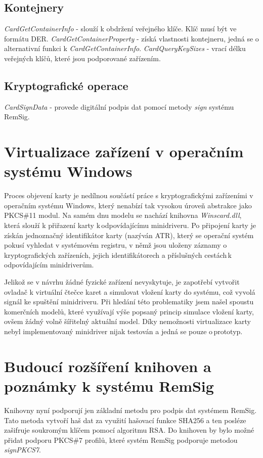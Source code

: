 \documentclass[]{fithesis3}
\begin{document}
		\subsection{Kontejnery}
		\textit{CardGetContainerInfo} - slouží k obdržení veřejného klíče. Klíč musí být 			ve formátu DER.
		\newline
 		\newline
		\textit{CardGetContainerProperty} - získá vlastnosti kontejneru, jedná se o alternativní 			funkci k \textit{CardGetContainerInfo}.
		\newline
		\newline
		\textit{CardQueryKeySizes} - vrací délku veřejných klíčů, které jsou podporované 				zařízením.

		\subsection{Kryptografické operace}
		\textit{CardSignData} - provede digitální podpis dat pomocí metody  \textit{sign} systému 			RemSig. 

	\section{Virtualizace zařízení v operačním systému Windows}
	
	Proces objevení karty je nedílnou součástí práce s kryptografickými zařízeními v operačním 			systému Windows, který nenabízí tak vysokou úroveň abstrakce jako PKCS\#11 modul. Na 		samém dnu modelu se nachází knihovna \textit{Winscard.dll}, která slouží k přiřazení karty k\,odpovídajícímu minidriveru. Po připojení karty je získán jednoznačný identifikátor karty (nazýván 		ATR), který se operační systém pokusí vyhledat v systémovém registru, v němž jsou uloženy 		záznamy o kryptografických zařízeních, jejich identifikátorech a příslušných cestách\,k 				odpovídajícím minidriverům.

	Jelikož se v návrhu žádné fyzické zařízení nevyskytuje, je zapotřebí vytvořit ovladač k virtuální 		čtečce karet a simulovat vložení karty do systému, což vyvolá signál ke spuštění minidriveru. Při 	hledání této problematiky jsem našel spoustu komerčních modelů, které využívají výše 			popsaný princip simulace vložení karty, ovšem žádný volně šířitelný aktuální model. Díky 			nemožnosti virtualizace karty nebyl implementovaný minidriver nijak testován a jedná se pouze 		o\,prototyp.

	\section{Budoucí rozšíření knihoven a poznámky k systému RemSig}
	Knihovny nyní podporují jen základní metodu pro podpis dat systémem RemSig. Tato metoda 		vytvoří haš dat za využití hašovací funkce SHA256 a ten posléze zašifruje soukromým klíčem 		pomocí algoritmu RSA. Do knihoven by bylo možné přidat podporu PKCS\#7 profilů, které 			systém RemSig podporuje metodou \textit{signPKCS7}.  \newline
\end{document}
